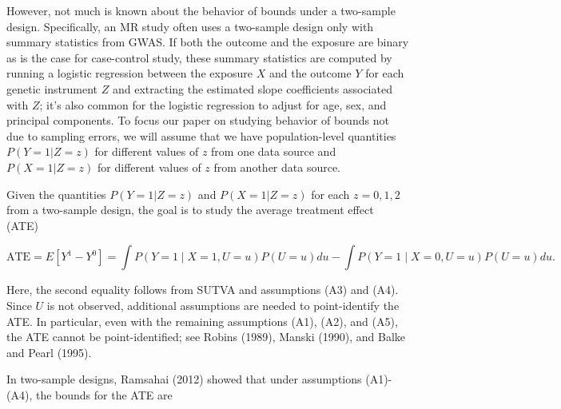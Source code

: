 \documentclass[
]{article}
\theoremstyle{plain}
\begin{document}
However, not much is known about the behavior of bounds under a two-sample design. Specifically, an MR study often uses a two-sample design only with summary statistics from GWAS. If both the outcome and the exposure are binary as is the case for case-control study, these summary statistics are computed by running a logistic regression between the exposure \(X\) and the outcome \(Y\) for each genetic instrument \(Z\) and extracting the estimated slope coefficients associated with \(Z\); it's also common for the logistic regression to adjust for age, sex, and principal components. To focus our paper on studying behavior of bounds not due to sampling errors, we will assume that we have population-level quantities \(P(Y = 1 | Z = z)\) for different values of \(z\) from one data source and \(P(X = 1 | Z = z)\) for different values of \(z\) from another data source.

Given the quantities \(P(Y = 1 | Z = z)\) and \(P(X = 1 | Z = z)\) for each \(z=0,1,2\) from a two-sample design, the goal is to study the average treatment effect (ATE)

\[
\text{ATE} = E[Y^1 - Y^0] = \int P(Y=1 \mid X = 1, U=u) P(U=u) du - \int P(Y=1 \mid X = 0, U=u) P(U=u) du.
\]

Here, the second equality follows from SUTVA and assumptions (A3) and (A4). Since \(U\) is not observed, additional assumptions are needed to point-identify the ATE. In particular, even with the remaining assumptions (A1), (A2), and (A5), the ATE cannot be point-identified; see Robins (1989), Manski (1990), and Balke and Pearl (1995).

In two-sample designs, Ramsahai (2012) showed that under assumptions (A1)-(A4), the bounds for the ATE are
\end{document}
